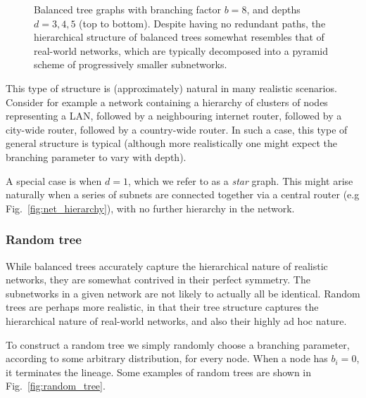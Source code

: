 \documentclass[aps, rmp, twocolumn, amsmath, amssymb, nofootinbib, superscriptaddress, longbibliography, floatfix, table-of-contents, eqsecnum]{revtex4-1}
\begin{document}
\begin{figure}[!htb]
\caption{Balanced tree graphs with branching factor $b=8$, and depths $d=3,4,5$ (top to bottom). Despite having no redundant paths, the hierarchical structure of balanced trees somewhat resembles that of real-world networks, which are typically decomposed into a pyramid scheme of progressively smaller subnetworks.} \label{fig:tree_example}
\end{figure}

This type of structure is (approximately) natural in many realistic scenarios. Consider for example a network containing a hierarchy of clusters of nodes representing a LAN, followed by a neighbouring internet router, followed by a city-wide router, followed by a country-wide router. In such a case, this type of general structure is typical (although more realistically one might expect the branching parameter to vary with depth).

A special case is when \mbox{$d=1$}, which we refer to as a \textit{star} graph. This might arise naturally when a series of subnets are connected together via a central router (e.g Fig.~\ref{fig:net_hierarchy}), with no further hierarchy in the network.

%
%

\subsubsection{Random tree} 

While balanced trees accurately capture the hierarchical nature of realistic networks, they are somewhat contrived in their perfect symmetry. The subnetworks in a given network are not likely to actually all be identical. Random trees are perhaps more realistic, in that their tree structure captures the hierarchical nature of real-world networks, and also their highly ad hoc nature.

To construct a random tree we simply randomly choose a branching parameter, according to some arbitrary distribution, for every node. When a node has \mbox{$b_i=0$}, it terminates the lineage. Some examples of random trees are shown in Fig.~\ref{fig:random_tree}.
\end{document}
